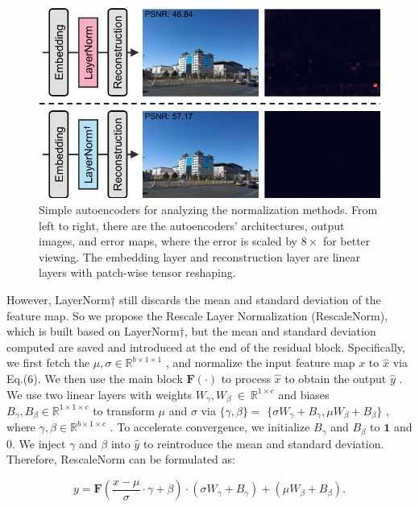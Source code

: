 \begin{figure}[htbp]
\centering
\includegraphics[width=0.8\linewidth]{images/0b0345c927e34617090e5a8db035aeafdfd26e0a1e6f3761d3f8d40cc75b7005.jpg}
\caption{Simple autoencoders for analyzing the normalization methods. From left to right, there are the autoencoders’ architectures, output images, and error maps, where the error is scaled by $8\times$ for better viewing. The embedding layer and reconstruction layer are linear layers with patch-wise tensor reshaping.}
\label{fig:3}
\end{figure}


However, LayerNorm† still discards the mean and standard deviation of the feature map. So we propose the Rescale Layer Normalization (RescaleNorm), which is built based on LayerNorm†, but the mean and standard deviation computed are saved and introduced at the end of the residual block. Specifically, we first fetch the $\mu,\sigma\in\mathbb{R}^{b\times1\times1}$ , and normalize the input feature map $x$ to $\hat{x}$ via Eq.(6). We then use the main block $\mathbf{F}(\cdot)$ to process $\hat{x}$ to obtain the output $\hat{y}$ . We use two linear layers with weights $W_{\gamma},W_{\beta}~\in~\mathbb{R}^{1\times c}$ and biases $B_{\gamma},B_{\beta}\in\mathbb{R}^{1\times1\times c}$ to transform $\mu$ and $\sigma$ via $\{\gamma,\beta\}=$ $\{\sigma W_{\gamma}+B_{\gamma},\mu W_{\beta}+B_{\beta}\}$ , where $\gamma,\beta\in\mathbb{R}^{b\times1\times c}$ . To accelerate convergence, we initialize $B_{\gamma}$ and $B_{\beta}$ to $\mathbf{1}$ and 0. We inject $\gamma$ and $\beta$ into $\hat{y}$ to reintroduce the mean and standard deviation. Therefore, RescaleNorm can be formulated as:

\begin{equation}
y=\mathbf F\left(\frac{x-\mu}{\sigma}\cdot\gamma+\beta\right)\cdot(\sigma W_{\gamma}+B_{\gamma})+(\mu W_{\beta}+B_{\beta}).
\end{equation}


